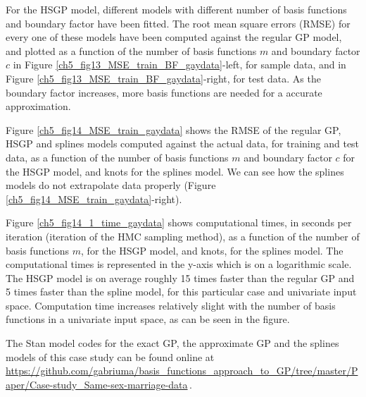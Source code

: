 \documentclass[onecolumn,a4paper,11pt]{article}
\begin{document}
For the HSGP model, different models with different number of basis functions and boundary factor have been fitted. The root mean square errors (RMSE) for every one of these models have been computed against the regular GP model, and plotted as a function of the number of basis functions $m$ and boundary factor $c$ in Figure \ref{ch5_fig13_MSE_train_BF_gaydata}-left, for sample data, and in Figure \ref{ch5_fig13_MSE_train_BF_gaydata}-right, for test data. As the boundary factor increases, more basis functions are needed for a accurate approximation.

Figure \ref{ch5_fig14_MSE_train_gaydata} shows the RMSE of the regular GP, HSGP and splines models computed against the actual data, for training and test data, as a function of the number of basis functions $m$ and boundary factor $c$ for the HSGP model, and  knots for the splines model. We can see how the splines models do not extrapolate data properly (Figure \ref{ch5_fig14_MSE_train_gaydata}-right). 

Figure \ref{ch5_fig14_1_time_gaydata} shows computational times, in seconds per iteration (iteration of the HMC sampling method), as a function of the number of basis functions $m$, for the HSGP model, and knots, for the splines model. The computational times is represented in the y-axis which is on a logarithmic scale. The HSGP model is on average roughly 15 times faster than the regular GP and 5 times faster than the spline model, for this particular case and univariate input space. Computation time increases relatively slight with the number of basis functions in a univariate input space, as can be seen in the figure.

The Stan model codes for the exact GP, the approximate GP and the splines models of this case study can be found online at {\small \url{https://github.com/gabriuma/basis_functions_approach_to_GP/tree/master/Paper/Case-study_Same-sex-marriage-data}}\,.

\end{document}
